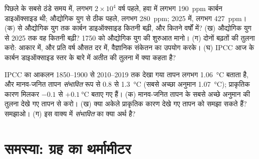 \begin{exercise}[$\star\star\star$]\label{exo:g9:climate-past-and-present:11}
पिछले  के सबसे ठंडे समय में, लगभग $2 \times 10^4$ वर्ष पहले, हवा में लगभग
\qty{190}{ppm} कार्बन डाइऑक्साइड थी; औद्योगिक युग से ठीक पहले, लगभग
\qty{280}{ppm}; 2025 में, लगभग \qty{427}{ppm}। (क)  से औद्योगिक युग तक कार्बन
डाइऑक्साइड कितनी बढ़ी, और कितने वर्षों में? (ख) औद्योगिक युग से 2025 तक वह कितनी बढ़ी?
1750 को औद्योगिक युग की शुरुआत मानो। (ग) दोनों बढ़तों की तुलना करो: आकार में, और प्रति
वर्ष औसत दर में, वैज्ञानिक संकेतन का उपयोग करके। (घ) IPCC आज के कार्बन डाइऑक्साइड स्तर
के बारे में अतीत की तुलना में क्या कहता
है?
\end{exercise}

\begin{exercise}[$\star\star\star$]\label{exo:g9:climate-past-and-present:12}
IPCC का आकलन 1850--1900 से 2010--2019 तक देखा गया तापन लगभग
\qty{1.06}{\degreeCelsius} बताता है, और मानव-जनित तापन \emph{संभावित} रूप से 0.8 से
\qty{1.3}{\degreeCelsius} (सबसे अच्छा अनुमान \qty{1.07}{\degreeCelsius}); प्राकृतिक
कारण मिलकर $-0.1$ से $+\qty{0.1}{\degreeCelsius}$ बताए गए हैं। (क) मानव-जनित तापन के
सबसे अच्छे अनुमान की तुलना देखे गए तापन से करो। (ख) क्या अकेले प्राकृतिक कारण देखे गए
तापन को समझा सकते हैं? समझाओ। (ग) इस वाक्य में \emph{संभावित} का क्या अर्थ
है?
\end{exercise}

\section{समस्या: ग्रह का थर्मामीटर}

